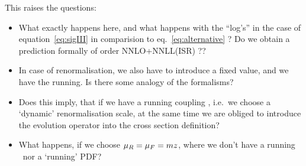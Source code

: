 \documentclass[12pt]{article}
\begin{document}
This raises the questions:
\begin{itemize}
  \item What exactly happens here, and what happens with the ``log's'' in the case of equation~\ref{eq:sigIII} in comparision to eq.~\ref{eq:alternative} ? Do we obtain a prediction formally of order NNLO+NNLL(ISR) ??
  \item In case of renormalisation, we also have to introduce a fixed value, and we have the running. Is there some analogy of the formalisms?
  \item Does this imply, that if we have a running coupling \asmur, i.e.\ we choose a `dynamic' renormalisation scale,
    at the same time we are obliged to introduce the evolution operator into the cross section definition?
  \item What happens, if we choose $\mu_{R}=\mu_{F}=mz$, where we don't have a running \asmur\ nor a `running' PDF?
\end{itemize}
\end{document}
